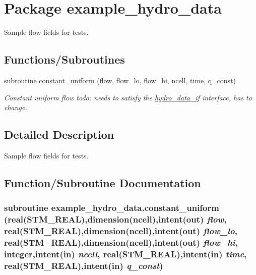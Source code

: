\hypertarget{a00029}{
\section{Package example\_\-hydro\_\-data}
\label{a00029}
}
Sample flow fields for tests.  


\subsection*{Functions/Subroutines}
\begin{CompactItemize}
\item 
subroutine \hyperlink{a00029_b28caf18eccb73132ba5037a9c2e7081}{constant\_\-uniform} (flow, flow\_\-lo, flow\_\-hi, ncell, time, q\_\-const)
\begin{CompactList}\small\item\em Constant uniform flow todo: needs to satisfy the \hyperlink{a00034}{hydro\_\-data\_\-if} interface, has to change. \item\end{CompactList}\end{CompactItemize}


\subsection{Detailed Description}
Sample flow fields for tests. 



\subsection{Function/Subroutine Documentation}
\hypertarget{a00029_b28caf18eccb73132ba5037a9c2e7081}{
\subsubsection[{constant\_\-uniform}]{\setlength{\rightskip}{0pt plus 5cm}subroutine example\_\-hydro\_\-data.constant\_\-uniform (real(STM\_\-REAL),dimension(ncell),intent(out) {\em flow}, \/  real(STM\_\-REAL),dimension(ncell),intent(out) {\em flow\_\-lo}, \/  real(STM\_\-REAL),dimension(ncell),intent(out) {\em flow\_\-hi}, \/  integer,intent(in) {\em ncell}, \/  real(STM\_\-REAL),intent(in) {\em time}, \/  real(STM\_\-REAL),intent(in) {\em q\_\-const})}}
\label{a00029_b28caf18eccb73132ba5037a9c2e7081}


